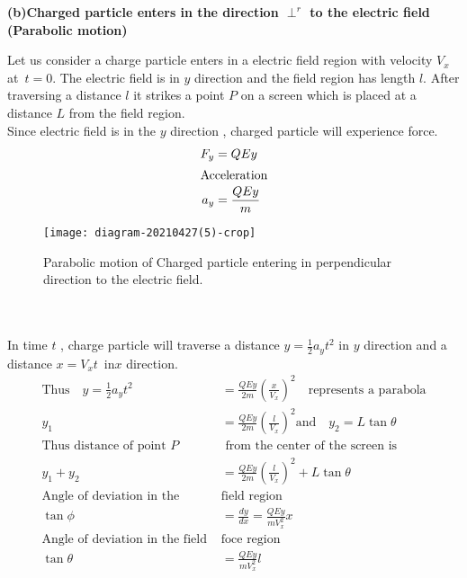 \textbf{(b)}\quad \textbf{Charged particle enters in the direction $\perp^r$ to the electric field (Parabolic motion)}\\
 \begin{minipage}{0.55\textwidth}
Let us consider a charge particle enters in a electric field region with velocity $V_x$ at\ $t=0$. The electric field is in $y$ direction and the field region has length $l$. After traversing a distance $l$ it strikes a point $P$ on a screen which is placed at a distance $L$ from the field region. \\
Since electric field is in the $y$ direction , charged particle will experience force.
\begin{align*}
F_y&=QEy\\ 
\intertext{Acceleration}
a_y&=\frac{QEy}{m}\\
\end{align*}
\end{minipage}
\begin{minipage}{0.45\textwidth}
	\begin{figure}[H]
		\centering
		\texttt{[image: diagram-20210427(5)-crop]}
		\caption{Parabolic motion of Charged particle entering in   perpendicular direction to the electric field.}
		\label{rc current discharge}
	\end{figure}
\end{minipage}\\\\	
In time $t$ , charge particle will traverse a distance $y=\frac{1}{2}a_yt^2$ in $y$ direction and a distance $x=V_xt$\  in$x$ direction.
\begin{align*}
\text{Thus}\quad y=\frac{1}{2}a_yt^2&=\frac{QEy}{2m}(\frac{x}{V_x})^2 \quad\text{represents a parabola}\\
y_1&=\frac{QEy}{2m}(\frac{l}{V_x})^2\text{and}\quad y_2=L \tan\theta\\
\text{Thus distance of point $P$}&\text{ from the center of the screen is}\\
y_1+y_2&=\frac{QEy}{2m}(\frac{l}{V_x})^2+L \tan\theta\\
\text{Angle of deviation in the }&\text{field region}\\
\tan\phi&=\frac{dy}{dx}=\frac{QEy}{mV_x^2}x\\
\text{Angle of deviation in the field }&\text{foce  region}\\
\tan\theta&=\frac{QEy}{mV_x^2}l
\end{align*}
